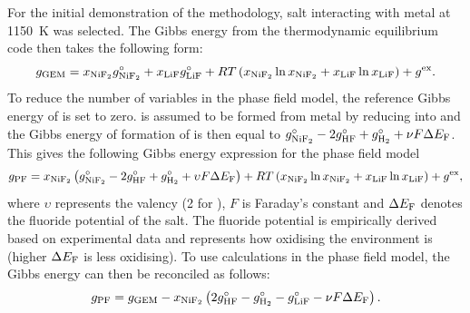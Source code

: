 For the initial demonstration of the methodology,  salt interacting with  metal at \SI{1150}{\kelvin} was selected. The Gibbs energy from the thermodynamic equilibrium code then takes the following form:
\begin{equation*}
	g_\text{GEM} = x_{\ce{NiF2}} g_{\ce{NiF2}}^\circ + x_{\ce{LiF}} g_{\ce{LiF}}^\circ + RT\left( x_{\ce{NiF2}} \ln{x_{\ce{NiF2}}} + x_{\ce{LiF}} \ln{x_{\ce{LiF}}} \right) + g^\text{ex}.
\end{equation*}
To reduce the number of variables in the phase field model, the reference Gibbs energy of  is set to zero.  is assumed to be formed from  metal by reducing    into  and the Gibbs energy of formation of  is then equal to $g_{\ce{NiF2}}^\circ - 2 g_{\ce{HF}}^\circ + g_{\ce{H2}}^\circ + \nu F \Delta E_{\ce{F}}$. This gives the following Gibbs energy expression for the phase field model
\begin{equation*}
	g_\text{PF} = x_{\ce{NiF2}} \left( g_{\ce{NiF2}}^\circ - 2 g_{\ce{HF}}^\circ + g_{\ce{H2}}^\circ + \upsilon F \Delta E_{\ce{F}} \right) + RT\left( x_{\ce{NiF2}} \ln{x_{\ce{NiF2}}} + x_{\ce{LiF}} \ln{x_{\ce{LiF}}} \right) + g^\text{ex},
\end{equation*}
where $\upsilon$ represents the valency (2 for ), $F$ is Faraday's constant and $\Delta E_{\ce{F}}$ denotes the fluoride potential of the salt. The fluoride potential is empirically derived based on experimental data and represents how oxidising the environment is (higher $\Delta E_{\ce{F}}$ is less oxidising). To use {\GEM} calculations in the phase field model, the Gibbs energy can then be reconciled as follows:
\begin{equation*}
	g_\text{PF} = g_\text{GEM} - x_{\ce{NiF2}} \left( 2 g_{\ce{HF}}^\circ - g_{\ce{H2}}^\circ - g_{\ce{LiF}}^\circ - \nu F \Delta E_{\ce{F}} \right).
\end{equation*}

